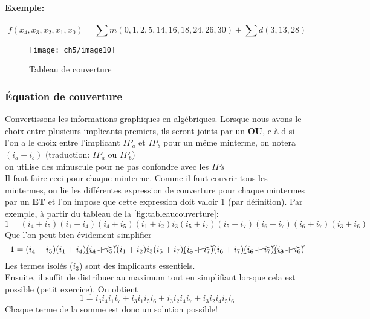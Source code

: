 \paragraph{Exemple:}
\begin{equation*}
	f(x_4,x_3,x_2,x_1,x_0)=\sum m(0,1,2,5,14,16,18,24,26,30)+\sum d(3,13,28)
\end{equation*}
\begin{figure}[H]
	\hspace{-1.5cm}
	\texttt{[image: ch5/image10]}
	\caption{Tableau de couverture}
	\label{fig:tableaucouverture}
\end{figure}
\subsubsection{Équation de couverture}
Convertissons les informations graphiques en algébriques. Lorsque nous avons le choix entre plusieurs implicants premiers, ils seront joints par un \textbf{OU}, c-à-d si l'on a le choix entre l'implicant $IP_a$ et $IP_b$ pour un même minterme, on notera $(i_a+i_b)$ (traduction: $IP_a$ ou $IP_b$)\\
\danger on utilise des minuscule pour ne pas confondre avec les $IPs$\\

Il faut faire ceci pour chaque minterme. Comme il faut couvrir tous les mintermes, on lie les différentes expression de couverture pour chaque mintermes par un \textbf{ET} et l'on impose que cette expression doit valoir 1 (par définition). Par exemple, à partir du tableau de la \autoref{fig:tableaucouverture}:
\begin{equation}
	1=(i_4+i_5)(i_1 +i_4)(i_4+i_5)(i_1+i_2)i_3(i_5+i_7)(i_5+i_7)(i_6+i_7)(i_6+i_7)(i_3+i_6)
\end{equation}
Que l'on peut bien évidement simplifier
\begin{equation}
	1=(i_4+i_5)(i_1 +i_4)\cancel{(i_4+i_5)}(i_1+i_2)i_3(i_5+i_7)\cancel{(i_5+i_7)}(i_6+i_7)\cancel{(i_6+i_7)}\cancel{(i_3+i_6)}
\end{equation}
Les termes isolés ($i_3$) sont des implicants essentiels.\\
Ensuite, il suffit de distribuer au maximum tout en simplifiant lorsque cela est possible (petit exercice). On obtient
\begin{equation}
	1=i_3i_4i_1i_7+i_3i_1i_5i_6+i_3i_2i_4i_7+i_3i_2i_4i_5i_6
\end{equation}
Chaque terme de la somme est donc un solution possible!\\

